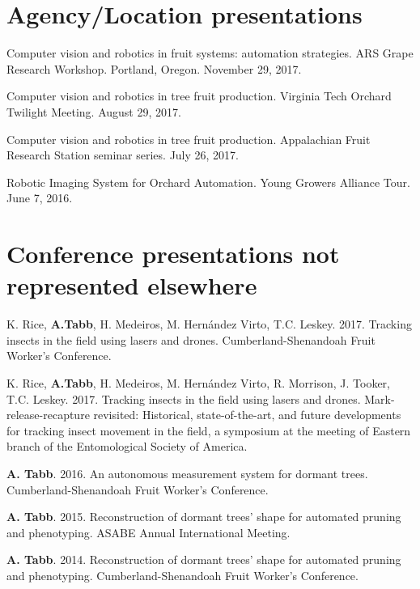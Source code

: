 \documentclass[letterpaper,11pt]{article}
\begin{document}
\section{Agency/Location presentations}
\begin{enumerate}[noitemsep, leftmargin=*,label={[L\arabic*]}]
\item{Computer vision and robotics in fruit systems: automation strategies.  ARS Grape Research Workshop.  Portland, Oregon.  November 29, 2017. }

\item{ Computer vision and robotics in tree fruit production.  Virginia Tech Orchard Twilight Meeting. August 29, 2017.}

\item{ Computer vision and robotics in tree fruit production.  Appalachian Fruit Research Station seminar series. July 26, 2017.}

\item{ Robotic Imaging System for Orchard Automation. Young Growers Alliance Tour. June 7, 2016.}
\end{enumerate}

\section{Conference presentations not represented elsewhere}
\begin{enumerate}[noitemsep, leftmargin=*,label={[CP\arabic*]}]
\item{K. Rice, \textbf{A.Tabb}, H. Medeiros, M. Hern{\'a}ndez Virto, T.C. Leskey. 2017. Tracking insects in the field using lasers and drones. Cumberland-Shenandoah Fruit Worker's Conference. } 

\item{ K. Rice, \textbf{A.Tabb}, H. Medeiros, M. Hern{\'a}ndez Virto, R. Morrison, J. Tooker,  T.C. Leskey. 2017. Tracking insects in the field using lasers and drones. Mark-release-recapture revisited: Historical, state-of-the-art, and future developments for tracking insect movement in the field, a symposium at the meeting of Eastern branch of the Entomological Society of America.}

\item{ \textbf{A. Tabb}. 2016. An autonomous measurement system for dormant trees. Cumberland-Shenandoah Fruit Worker's Conference.}

\item{ \textbf{A. Tabb}. 2015. Reconstruction of dormant trees' shape for automated pruning and phenotyping. ASABE Annual International Meeting.}

\item{ \textbf{A. Tabb}. 2014. Reconstruction of dormant trees' shape for automated pruning and phenotyping. Cumberland-Shenandoah Fruit Worker's Conference.}
\end{enumerate}
\end{document}

